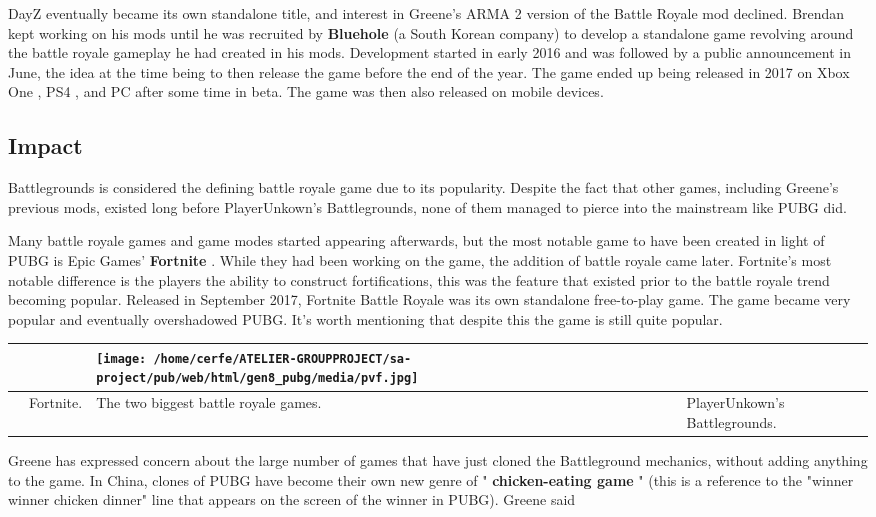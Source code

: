 \documentclass[a4paper,10pt]{book}
\begin{document}
 
        DayZ eventually became its own standalone title, and interest in Greene's ARMA 2 version of the Battle Royale mod declined. Brendan kept working on his mods until he was recruited by  \textbf{Bluehole }  (a South Korean company) to develop a standalone game revolving around the battle royale gameplay he had created in his mods. Development started in early 2016 and was followed by a public announcement in June, the idea at the time being to then release the game before the end of the year. The game ended up being released in 2017 on  Xbox One ,  PS4 , and PC after some time in beta. The game was then also released on mobile devices.
       
 \subsection{Impact }
 
        Battlegrounds is considered the defining battle royale game due to its popularity. Despite the fact that other games, including Greene's previous mods, existed long before PlayerUnkown's Battlegrounds, none of them managed to pierce into the mainstream like PUBG did.
       
 
        Many battle royale games and game modes started appearing afterwards, but the most notable game to have been created in light of PUBG is Epic Games'  \textbf{Fortnite } . While they had been working on the game, the addition of battle royale came later. Fortnite's most notable difference is the players the ability to construct fortifications, this was the feature that existed prior to the battle royale trend becoming popular. Released in September 2017,
         Fortnite Battle Royale  was its own standalone free-to-play game. The game became very popular and eventually overshadowed PUBG. It's worth mentioning that despite this the game is still quite popular.
       
 \begin{longtable}{p{1mm}|l|l|l|}\hline
 
 & 
 & \texttt{[image: /home/cerfe/ATELIER-GROUPPROJECT/sa-project/pub/web/html/gen8\_pubg/media/pvf.jpg]}
 & 
 \\\hline
 
 & Fortnite. 
 & The two biggest battle royale games. 
 & PlayerUnkown's Battlegrounds. 
 \\\hline
 \end{longtable}
 
        Greene has expressed concern about the large number of games that have just cloned the Battleground mechanics, without adding anything to the game. In China, clones of PUBG have become their own new genre of " \textbf{chicken-eating game } " (this is a reference to the "winner winner chicken dinner" line that appears on the screen of the winner in PUBG). Greene said
       
\end{document}
